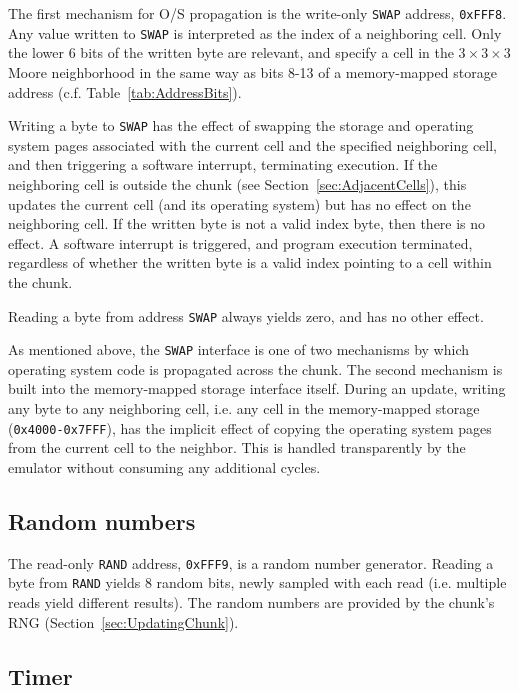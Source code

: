 \documentclass{article}
\newcommand\code[1]{{\tt #1}}
\newcommand\hex[1]{{\tt 0x#1}}
\newcommand\hexrange[2]{\hex{#1}{\tt -}\hex{#2}}
\begin{document}
The first mechanism for O/S propagation is the write-only \code{SWAP} address, \hex{FFF8}.
Any value written to \code{SWAP} is interpreted as the index of a neighboring cell.
Only the lower 6 bits of the written byte are relevant, and specify a cell in the $3 \times 3 \times 3$ Moore neighborhood
in the same way as bits 8-13 of a memory-mapped storage address (c.f. Table~\ref{tab:AddressBits}).

Writing a byte to \code{SWAP} has the effect of swapping the storage and operating system pages associated with the current cell and the specified neighboring cell,
and then triggering a software interrupt, terminating execution.
If the neighboring cell is outside the chunk (see Section~\ref{sec:AdjacentCells}),
this updates the current cell (and its operating system) but has no effect on the neighboring cell.
If the written byte is not a valid index byte, then there is no effect.
A software interrupt is triggered, and program execution terminated, regardless of whether the written byte is a valid index pointing to a cell within the chunk.

Reading a byte from address \code{SWAP} always yields zero, and has no other effect.

As mentioned above, the \code{SWAP} interface is one of two mechanisms by which operating system code is propagated across the chunk.
The second mechanism is built into the memory-mapped storage interface itself.
During an update, writing any byte to any neighboring cell, i.e. any cell in the memory-mapped storage (\hexrange{4000}{7FFF}),
has the implicit effect of copying the operating system pages from the current cell to the neighbor.
This is handled transparently by the emulator without consuming any additional cycles.

\subsection{Random numbers}

The read-only \code{RAND} address, \hex{FFF9}, is a random number generator.
Reading a byte from \code{RAND} yields 8 random bits, newly sampled with each read (i.e. multiple reads yield different results).
The random numbers are provided by the chunk's RNG (Section~\ref{sec:UpdatingChunk}).

\subsection{Timer}
\end{document}
